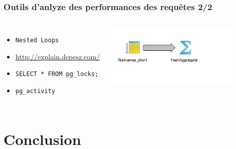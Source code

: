 \documentclass{beamer}
\begin{document}
\begin{frame}
  \frametitle{Outils d'anlyze des performances des requêtes 2/2}

  \vfill

\begin{columns}[c]
\begin{itemize}
  \item \texttt{Nested Loops}
  \item \url{http://explain.depesz.com/}
  \item \texttt{SELECT * FROM pg\_locks;}
  \item \texttt{pg\_activity}
\end{itemize}

\begin{center}
  \includegraphics[height=8em]{pg91_btree_explain_like2.png}
\end{center}
\end{columns}
\end{frame}

\section{Conclusion}

\end{document}
